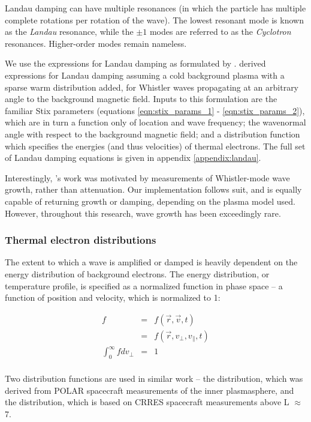 Landau damping can have multiple resonances (in which the particle has multiple complete rotations per rotation of the wave). The lowest resonant mode is known as the \emph{Landau} resonance, while the $\pm 1$ modes are referred to as the \emph{Cyclotron} resonances. Higher-order modes remain nameless.

We use the expressions for Landau damping as formulated by \cite{Brinca1972}. \citeauthor{Brinca1972} derived expressions for Landau damping assuming a cold background plasma with a sparse warm distribution added, for Whistler waves propagating at an arbitrary angle to the background magnetic field. Inputs to this formulation are the familiar Stix parameters (equations \ref{eqn:stix_params_1} - \ref{eqn:stix_params_2}), which are in turn a function only of location and wave frequency; the wavenormal angle with respect to the background magnetic field; and a distribution function which specifies the energies (and thus velocities) of thermal electrons. The full set of Landau damping equations is given in appendix \ref{appendix:landau}.

Interestingly, \citeauthor{Brinca1972}'s work was motivated by measurements of Whistler-mode wave growth, rather than attenuation. Our implementation follows suit, and is equally capable of returning growth or damping, depending on the plasma model used. However, throughout this research, wave growth has been exceedingly rare.

\subsubsection{Thermal electron distributions}

The extent to which a wave is amplified or damped is heavily dependent on the energy distribution of background electrons. The energy distribution, or temperature profile, is specified as a normalized function in phase space -- a function of position and velocity, which is normalized to 1:

\begin{eqnarray}
f  & = & f(\vec{r}, \vec{v}, t) \\
& =  & f(\vec{r}, v_\perp, v_\parallel, t) \\
\int_0^\infty f d v_\perp & = & 1 \\
\end{eqnarray}

Two distribution functions are used in similar work -- the \cite{Bell2002} distribution, which was derived from POLAR spacecraft measurements of the inner plasmasphere, and the \cite{Bortnik2007} distribution, which is based on CRRES spacecraft measurements above L $\approx$ 7.

